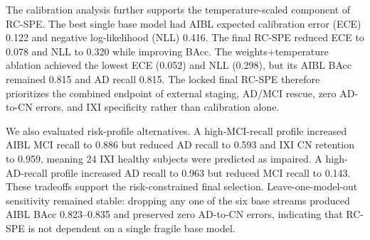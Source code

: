 \documentclass[12pt,a4paper]{article}
\begin{document}
\begin{table}[t]
\centering
\caption{Algorithmic ablation of RC-SPE. OASIS is reported only as a stress-test metric and was not used for final model selection.}
\label{tab:rcspe_ablation}
\scriptsize
{}
\end{table}

The calibration analysis further supports the temperature-scaled component of RC-SPE. The best single base model had AIBL expected calibration error (ECE) 0.122 and negative log-likelihood (NLL) 0.416. The final RC-SPE reduced ECE to 0.078 and NLL to 0.320 while improving BAcc. The weights+temperature ablation achieved the lowest ECE (0.052) and NLL (0.298), but its AIBL BAcc remained 0.815 and AD recall 0.815. The locked final RC-SPE therefore prioritizes the combined endpoint of external staging, AD/MCI rescue, zero AD-to-CN errors, and IXI specificity rather than calibration alone.

We also evaluated risk-profile alternatives. A high-MCI-recall profile increased AIBL MCI recall to 0.886 but reduced AD recall to 0.593 and IXI CN retention to 0.959, meaning 24 IXI healthy subjects were predicted as impaired. A high-AD-recall profile increased AD recall to 0.963 but reduced MCI recall to 0.143. These tradeoffs support the risk-constrained final selection. Leave-one-model-out sensitivity remained stable: dropping any one of the six base streams produced AIBL BAcc 0.823--0.835 and preserved zero AD-to-CN errors, indicating that RC-SPE is not dependent on a single fragile base model.
\end{document}
